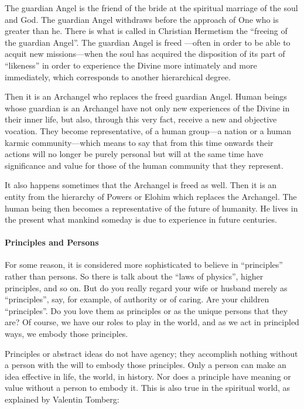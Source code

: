 \begin{quotex}
The guardian Angel is the friend of the bride at the spiritual marriage of the soul and God. The guardian Angel withdraws before the approach of One who is greater than he. There is what is called in Christian Hermetism the “freeing of the guardian Angel”. The guardian Angel is freed —often in order to be able to acquit new missions—when the soul has acquired the disposition of its part of “likeness” in order to experience the Divine more intimately and more immediately, which corresponds to another hierarchical degree.

Then it is an Archangel who replaces the freed guardian Angel. Human beings whose guardian is an Archangel have not only new experiences of the Divine in their inner life, but also, through this very fact, receive a new and objective vocation. They become representative, of a human group—a nation or a human karmic community—which means to say that from this time onwards their actions will no longer be purely personal but will at the same time have significance and value for those of the human community that they represent.

It also happens sometimes that the Archangel is freed as well. Then it is an entity from the hierarchy of Powers or Elohim which replaces the Archangel. The human being then becomes a representative of the future of humanity. He lives in the present what mankind someday is due to experience in future centuries.

\end{quotex}
\paragraph{Principles and Persons}
For some reason, it is considered more sophisticated to believe in “principles” rather than persons. So there is talk about the “laws of physics”, higher principles, and so on. But do you really regard your wife or husband merely as “principles”, say, for example, of authority or of caring. Are your children “principles”. Do you love them as principles or as the unique persons that they are? Of course, we have our roles to play in the world, and as we act in principled ways, we embody those principles.

Principles or abstract ideas do not have agency; they accomplish nothing without a person with the will to embody those principles. Only a person can make an idea effective in life, the world, in history. Nor does a principle have meaning or value without a person to embody it. This is also true in the spiritual world, as explained by Valentin Tomberg:

